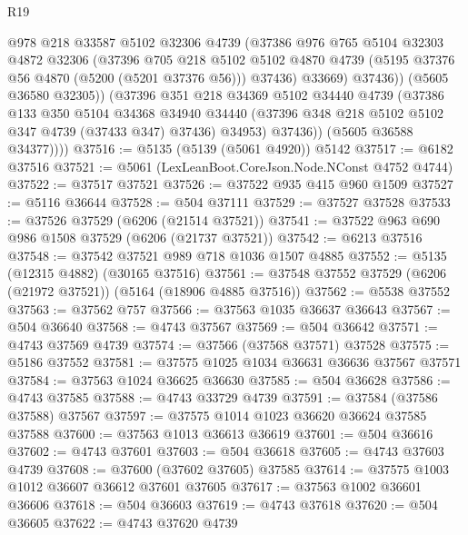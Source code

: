 \begin{lexlean}{R19}
\begin{coremodule}
{{{{{{{{{{{                  @978
                  @218
                  @33587
                  @5102
                  @32306
                  @4739
                  (@37386
                    @976
                    @765
                    @5104
                    @32303
                    @4872
                    @32306
                    (@37396
                      @705
                      @218
                      @5102
                      @5102
                      @4870
                      @4739
                      (@5195 @37376 @56 @4870 (@5200 (@5201 @37376 @56)))
                      @37436)
                    @33669)
                  @37436))
              (@5605 @36580 @32305))
            (@37396
              @351
              @218
              @34369
              @5102
              @34440
              @4739
              (@37386
                @133
                @350
                @5104
                @34368
                @34940
                @34440
                (@37396 @348 @218 @5102 @5102 @347 @4739 (@37433 @347) @37436)
                @34953)
              @37436))
          (@5605 @36588 @34377))))
@37516 := @5135 (@5139 (@5061 @4920)) @5142
@37517 := @6182 @37516
@37521 := @5061 (LexLeanBoot.CoreJson.Node.NConst @4752 @4744)
@37522 := @37517 @37521
@37526 := @37522 @935 @415 @960 @1509
@37527 := @5116 @36644
@37528 := @504 @37111
@37529 := @37527 @37528
@37533 := @37526 @37529 (@6206 (@21514 @37521))
@37541 := @37522 @963 @690 @986 @1508 @37529 (@6206 (@21737 @37521))
@37542 := @6213 @37516
@37548 := @37542 @37521 @989 @718 @1036 @1507 @4885
@37552 := @5135 (@12315 @4882) (@30165 @37516)
@37561 := @37548 @37552 @37529 (@6206 (@21972 @37521)) (@5164 (@18906 @4885 @37516))
@37562 := @5538 @37552
@37563 := @37562 @757
@37566 := @37563 @1035 @36637 @36643
@37567 := @504 @36640
@37568 := @4743 @37567
@37569 := @504 @36642
@37571 := @4743 @37569 @4739
@37574 := @37566 (@37568 @37571) @37528
@37575 := @5186 @37552
@37581 := @37575 @1025 @1034 @36631 @36636 @37567 @37571
@37584 := @37563 @1024 @36625 @36630
@37585 := @504 @36628
@37586 := @4743 @37585
@37588 := @4743 @33729 @4739
@37591 := @37584 (@37586 @37588) @37567
@37597 := @37575 @1014 @1023 @36620 @36624 @37585 @37588
@37600 := @37563 @1013 @36613 @36619
@37601 := @504 @36616
@37602 := @4743 @37601
@37603 := @504 @36618
@37605 := @4743 @37603 @4739
@37608 := @37600 (@37602 @37605) @37585
@37614 := @37575 @1003 @1012 @36607 @36612 @37601 @37605
@37617 := @37563 @1002 @36601 @36606
@37618 := @504 @36603
@37619 := @4743 @37618
@37620 := @504 @36605
@37622 := @4743 @37620 @4739
}}}}}}}}}}}
\end{coremodule}
\end{lexlean}
